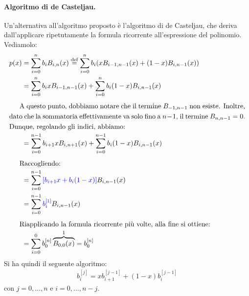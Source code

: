 \documentclass{article}
\begin{document}
\paragraph{Algoritmo di de Casteljau.} Un'alternativa all'algoritmo proposto è
l'algoritmo di de Casteljau, che deriva dall'applicare ripetutamente la
formula ricorrente all'espressione del polinomio. Vediamolo: 
\begin{equation*}
  \begin{aligned}
      p(x)&=\displaystyle\sum_{i=0}^{n}b_iB_{i,n}(x)\overset{\text{def}}{=}\displaystyle\sum_{i=0}^{n}b_i(xB_{i-1,n-1}(x)+(1-x)B_{i,n-1}(x))\\
          &=\displaystyle\sum_{i=0}^{n}b_ixB_{i-1,n-1}(x)+\displaystyle\sum_{i=0}^{n}b_i(1-x)B_{i,n-1}(x)
          \\ 
          \alignedintertext{A questo punto, dobbiamo notare che il termine $B_{-1,n-1}$ non
          esiste. Inoltre, dato che la sommatoria effettivamente va solo fino
      a $n-1$, il termine $B_{n,n-1}=0$. Dunque, regolando gli indici,
  abbiamo:}
          &=\displaystyle\sum_{i=0}^{n-1}b_{i+1}xB_{i,n+1}(x)+\displaystyle\sum_{i=0}^{n-1}b_i(1-x)B_{i,n-1}(x)\\
          \alignedintertext{Raccogliendo:}
          &=
          \displaystyle\sum_{i=0}^{n-1}{\color{blue}\left[b_{i+1}x+b_i(1-x)\right]}B_{i,n-1}(x)\\ 
          &=\displaystyle\sum_{i=0}^{n-1}{\color{blue}b_i^{[1]}}B_{i,n-1}(x) \\
          \alignedintertext{Riapplicando la formula ricorrente più volte, alla
          fine si ottiene:}
          &=\displaystyle\sum_{i=0}^{0}b_0^{[n]}\overbrace{B_{0,0}(x)}^1=b_0^{[n]}
  \end{aligned}  
\end{equation*}
Si ha quindi il seguente algoritmo:
\begin{equation} \label{eq:de_casteljau}
   \begin{aligned}
       b_{i}^{[j]}=xb_{i+1}^{[j-1]}+(1-x)b_{i}^{[j-1]}
   \end{aligned} 
\end{equation}
con $j=0,\ldots,n$ e $i=0,\ldots,n-j$.
\end{document}

